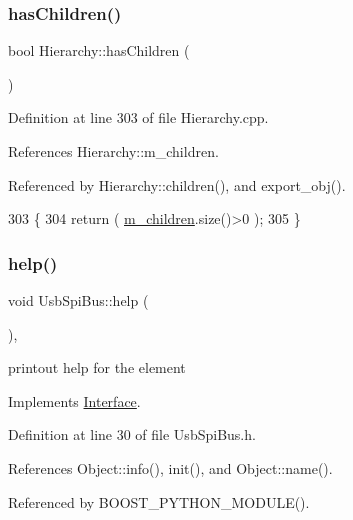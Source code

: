 \subsubsection{\texorpdfstring{has\+Children()}{hasChildren()}}
{\footnotesize\ttfamily bool Hierarchy\+::has\+Children (\begin{DoxyParamCaption}{ }\end{DoxyParamCaption})\hspace{0.3cm}{\ttfamily [inherited]}}



Definition at line 303 of file Hierarchy.\+cpp.



References Hierarchy\+::m\+\_\+children.



Referenced by Hierarchy\+::children(), and export\+\_\+obj().


\begin{DoxyCode}
303                               \{
304   \textcolor{keywordflow}{return} ( \hyperlink{classHierarchy_a038816763941fd4a930504917f60483b}{m\_children}.size()>0 );
305 \}
\end{DoxyCode}
\mbox{\label{classUsbSpiBus_a3543b3bbad0c137fde32fdc554a09a5d}} 
\subsubsection{\texorpdfstring{help()}{help()}}
{\footnotesize\ttfamily void Usb\+Spi\+Bus\+::help (\begin{DoxyParamCaption}{ }\end{DoxyParamCaption})\hspace{0.3cm}{\ttfamily [inline]}, {\ttfamily [virtual]}}

printout help for the element 

Implements \hyperlink{classInterface_aedd3cf1d964c837e7848ccf81dc9c760}{Interface}.



Definition at line 30 of file Usb\+Spi\+Bus.\+h.



References Object\+::info(), init(), and Object\+::name().



Referenced by B\+O\+O\+S\+T\+\_\+\+P\+Y\+T\+H\+O\+N\+\_\+\+M\+O\+D\+U\+L\+E().



